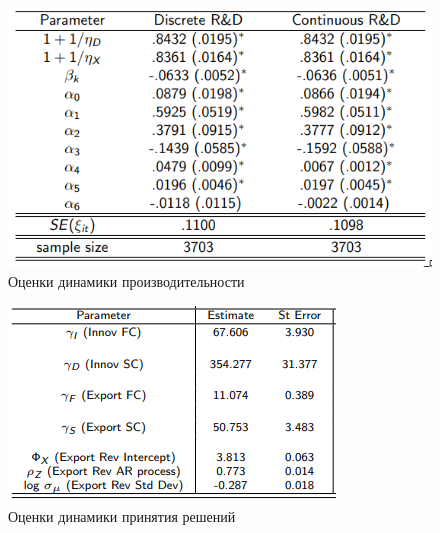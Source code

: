 \documentclass[c, dvipsnames]{beamer}  %
\begin{document}
\begin{frame}[shrink=3]
\frametitle{\insertsection} 

\begin{figure}
	\centering
	\includegraphics[width=0.7\linewidth]{screenshot010}
	\caption{Оценки динамики производительности}
	\label{fig:screenshot010}
\end{figure}


\begin{figure}
	\centering
	\includegraphics[width=0.7\linewidth]{screenshot011}
	\caption{Оценки динамики принятия решений}
	\label{fig:screenshot011}
\end{figure}


\end{frame}
\end{document}
